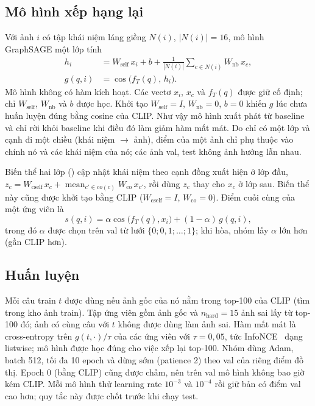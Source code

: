 \subsection{Mô hình xếp hạng lại}
\label{sec:model}
Với ảnh $i$ có tập khái niệm láng giềng $N(i)$, $|N(i)| = 16$, mô hình GraphSAGE một lớp tính
\begin{align}
h_i &= W_{\text{self}}\,x_i + b + \frac{1}{|N(i)|}\sum_{c\in N(i)} W_{\text{nb}}\,x_c, \label{eq:sage}\\
g(q,i) &= \cos\big(f_T(q),\,h_i\big).
\end{align}
Mô hình không có hàm kích hoạt. Các vectơ $x_i$, $x_c$ và $f_T(q)$ được giữ cố định; chỉ $W_{\text{self}}$, $W_{\text{nb}}$ và $b$ được học. Khởi tạo $W_{\text{self}} = I$, $W_{\text{nb}} = 0$, $b = 0$ khiến $g$ lúc chưa huấn luyện đúng bằng cosine của CLIP. Như vậy mô hình xuất phát từ baseline và chỉ rời khỏi baseline khi điều đó làm giảm hàm mất mát. Do chỉ có một lớp và cạnh đi một chiều (khái niệm $\to$ ảnh), điểm của một ảnh chỉ phụ thuộc vào chính nó và các khái niệm của nó; các ảnh val, test không ảnh hưởng lẫn nhau.

Biến thể hai lớp () cập nhật khái niệm theo cạnh đồng xuất hiện ở lớp đầu, $z_c = W_{\text{cself}}\,x_c + \operatorname{mean}_{c'\in co(c)} W_{\text{co}}\,x_{c'}$, rồi dùng $z_c$ thay cho $x_c$ ở lớp sau. Biến thể này cũng được khởi tạo bằng CLIP ($W_{\text{cself}} = I$, $W_{\text{co}} = 0$). Điểm cuối cùng của một ứng viên là
\begin{equation}
s(q,i) = \alpha\cos\big(f_T(q),x_i\big) + (1-\alpha)\,g(q,i),
\end{equation}
trong đó $\alpha$ được chọn trên val từ lưới $\{0; 0,1; \dots; 1\}$; khi hòa, nhóm lấy $\alpha$ lớn hơn (gần CLIP hơn).

\subsection{Huấn luyện}
Mỗi câu train $t$ được dùng nếu ảnh gốc của nó nằm trong top-100 của CLIP (tìm trong kho ảnh train). Tập ứng viên gồm ảnh gốc và $n_{\text{hard}} = 15$ ảnh sai lấy từ top-100 đó; ảnh có cùng câu với $t$ không được dùng làm ảnh sai. Hàm mất mát là cross-entropy trên $g(t,\cdot)/\tau$ của các ứng viên với $\tau = 0,05$, tức InfoNCE~\cite{oord2018cpc} dạng listwise; mô hình được học đúng cho việc xếp lại top-100. Nhóm dùng Adam, batch 512, tối đa 10 epoch và dừng sớm (patience 2) theo \mrr{} val của riêng điểm đồ thị. Epoch 0 (bằng CLIP) cũng được chấm, nên trên val mô hình không bao giờ kém CLIP. Mỗi mô hình thử learning rate $10^{-3}$ và $10^{-4}$ rồi giữ bản có điểm val cao hơn; quy tắc này được chốt trước khi chạy test.

